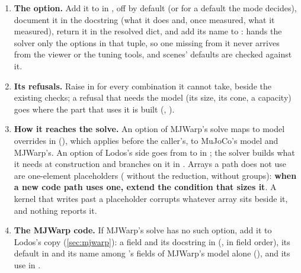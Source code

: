 \begin{enumerate}
\item \textbf{The option.} Add it to  in , off by default (or  for a default the mode decides), document it in the docstring (what it does and, once measured, what it measured), return it in the resolved dict, and add its name to :  hands the solver only the options in that tuple, so one missing from it never arrives from the viewer or the tuning tools, and scenes' defaults are checked against it.
\item \textbf{Its refusals.} Raise  in  for every combination it cannot take, beside the existing checks; a refusal that needs the model (its size, its cone, a capacity) goes where the part that uses it is built (, ).
\item \textbf{How it reaches the solve.} An option of MJWarp's solve maps to model overrides in  (), which  applies before the caller's, to MuJoCo's model and MJWarp's. An option of Lodos's side goes from  to  in ; the solver builds what it needs at construction and branches on it in . Arrays a path does not use are one-element placeholders ( without the reduction,  without groups): \textbf{when a new code path uses one, extend the condition that sizes it}. A kernel that writes past a placeholder corrupts whatever array sits beside it, and nothing reports it.
\item \textbf{The MJWarp code.} If MJWarp's solve has no such option, add it to Lodos's copy (\cref{sec:mjwarp}): a field and its docstring in  (, in field order), its default in  and its name among 's fields of MJWarp's model alone (), and its use in .

\end{enumerate}
